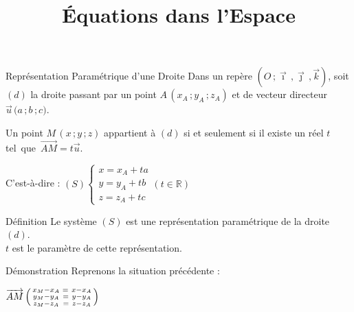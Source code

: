 \documentclass{cours}
\title{Équations dans l'Espace}
\begin{document}

    \begin{Gpartie}{Représentation Paramétrique d'une Droite} 
        Dans un repère $\left(O\,;\vec{\imath}\,,\vec{\jmath}\,,\vec{k}\right)$, soit $(d)$ la droite passant par un point $A\,\left(x_A\,; y_A\,; z_A\right)$ et de vecteur directeur $\vec{u}\,\big(a\,; b\,; c\big)$.

        Un point $M\,\left(x\,; y\,; z\right)$ appartient à $(d)$ si et seulement si il existe un réel $t$ tel~que~$\overrightarrow{AM}=t\vec{u}$.

        C'est-à-dire : $(S)\begin{cases} x=x_A+ta \\ y=y_A+tb \\ z=z_A+tc \end{cases}\left(t\in\mathbb{R}\right)$

        \begin{Spartie}{Définition} 
            Le système $(S)$ est une représentation paramétrique de la droite $(d)$. \\ $t$ est le paramètre de cette représentation.
            \begin{SSpartie}{Démonstration}
                Reprenons la situation précédente :
                
                $\overrightarrow{AM}\,\begin{psmallmatrix} x_M-x_A &=\ x-x_A \\ y_M-y_A &=\ y-y_A \\ z_M-z_A &=\ z-z_A \end{psmallmatrix}$


\end{SSpartie}
\end{Spartie}
\end{Gpartie}
\end{document}
